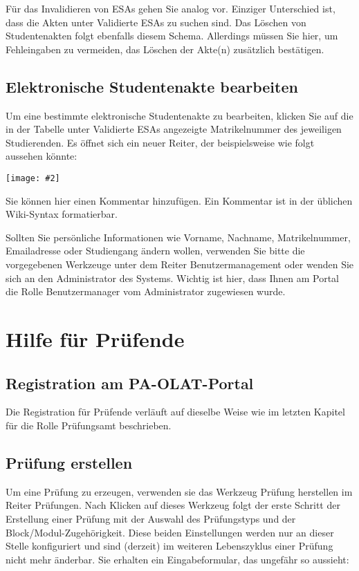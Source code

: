 \documentclass[a4paper,11pt]{article}
\newcommand{\bild}[2]{
    \begin{center}\texttt{[image: \#2]}\end{center}
}
\newcommand{\knopf}[1]{{\sc #1}}
\begin{document}
Für das Invalidieren von ESAs gehen Sie analog vor. Einziger Unterschied ist,
dass die Akten unter \knopf{Validierte ESAs} zu suchen sind.  Das Löschen von
Studentenakten folgt ebenfalls diesem Schema. Allerdings müssen Sie hier, um
Fehleingaben zu vermeiden, das Löschen der Akte(n) zusätzlich bestätigen.

\subsection{Elektronische Studentenakte bearbeiten}

Um eine bestimmte elektronische Studentenakte zu bearbeiten, klicken Sie auf
die in der Tabelle unter \knopf{Validierte ESAs} angezeigte Matrikelnummer des
jeweiligen Studierenden. Es öffnet sich ein neuer Reiter, der beispielsweise wie
folgt aussehen könnte:

\bild{.9}{ESA-Edit}

Sie können hier einen \knopf{Kommentar hinzufügen}. Ein Kommentar ist in der
üblichen Wiki-Syntax formatierbar.

Sollten Sie persönliche Informationen wie Vorname, Nachname,
Matrikelnummer, Emailadresse oder Studiengang ändern wollen, verwenden Sie
bitte die vorgegebenen Werkzeuge unter dem Reiter \knopf{Benutzermanagement}
oder wenden Sie sich an den Administrator des Systems. Wichtig ist hier, dass
Ihnen am Portal die Rolle Benutzermanager vom Administrator zugewiesen wurde.

\clearpage
\section{Hilfe für Prüfende}

\subsection{Registration am PA-OLAT-Portal}

Die Registration für Prüfende verläuft auf dieselbe Weise wie im letzten
Kapitel für die Rolle Prüfungsamt beschrieben.

\subsection{Prüfung erstellen}

Um eine Prüfung zu erzeugen, verwenden sie das Werkzeug \knopf{Prüfung
  herstellen} im Reiter \knopf{Prüfungen}. Nach Klicken auf dieses Werkzeug
folgt der erste Schritt der Erstellung einer Prüfung mit der Auswahl des
Prüfungstyps und der Block/Modul-Zugehörigkeit. Diese beiden Einstellungen
werden nur an dieser Stelle konfiguriert und sind (derzeit) im weiteren
Lebenszyklus einer Prüfung nicht mehr änderbar. Sie erhalten ein
Eingabeformular, das ungefähr so aussieht:
\end{document}

